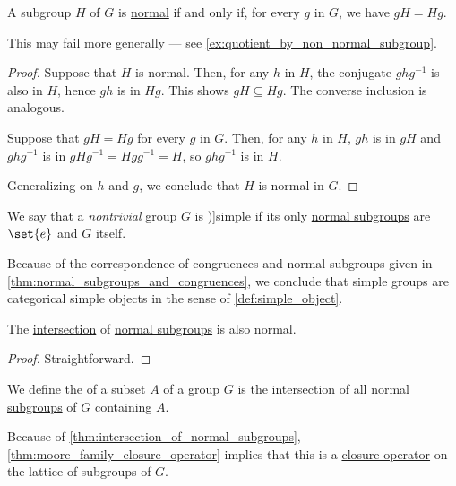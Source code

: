 \begin{proposition}\label{thm:normal_subgroup_left_right_cosets}
  A subgroup \( H \) of \( G \) is \hyperref[def:normal_subgroup]{normal} if and only if, for every \( g \) in \( G \), we have \( gH = Hg \).
\end{proposition}
\begin{comments}
  \item This may fail more generally --- see \cref{ex:quotient_by_non_normal_subgroup}.
\end{comments}
\begin{proof}
  \SufficiencySubProof Suppose that \( H \) is normal. Then, for any \( h \) in \( H \), the conjugate \( ghg^{-1} \) is also in \( H \), hence \( gh \) is in \( Hg \). This shows \( gH \subseteq Hg \). The converse inclusion is analogous.

  \NecessitySubProof Suppose that \( gH = Hg \) for every \( g \) in \( G \). Then, for any \( h \) in \( H \), \( gh \) is in \( gH \) and \( ghg^{-1} \) is in \( gHg^{-1} = Hgg^{-1} = H \), so \( ghg^{-1} \) is in \( H \).

  Generalizing on \( h \) and \( g \), we conclude that \( H \) is normal in \( G \).
\end{proof}

\begin{definition}\label{def:simple_group}
  We say that a \emph{nontrivial} group \( G \) is \term[ru=простая (группа) (\cite[def. 10.5.1]{Винберг2014КурсАлгебры})]{simple} if its only \hyperref[def:normal_subgroup]{normal subgroups} are \( \set{ e } \) and \( G \) itself.
\end{definition}
\begin{comments}
  \item Because of the correspondence of congruences and normal subgroups given in \cref{thm:normal_subgroups_and_congruences}, we conclude that simple groups are categorical simple objects in the sense of \cref{def:simple_object}.
\end{comments}

\begin{lemma}\label{thm:intersection_of_normal_subgroups}
  The \hyperref[def:set_intersection]{intersection} of \hyperref[def:normal_subgroup]{normal subgroups} is also normal.
\end{lemma}
\begin{proof}
  Straightforward.
\end{proof}

\begin{definition}\label{def:normal_closure}
  We define the  of a subset \( A \) of a group \( G \) is the intersection of all \hyperref[def:normal_subgroup]{normal subgroups} of \( G \) containing \( A \).
\end{definition}
\begin{comments}
  \item Because of \cref{thm:intersection_of_normal_subgroups}, \cref{thm:moore_family_closure_operator} implies that this is a \hyperref[def:abstract_closure_operator]{closure operator} on the lattice of subgroups of \( G \).
\end{comments}

